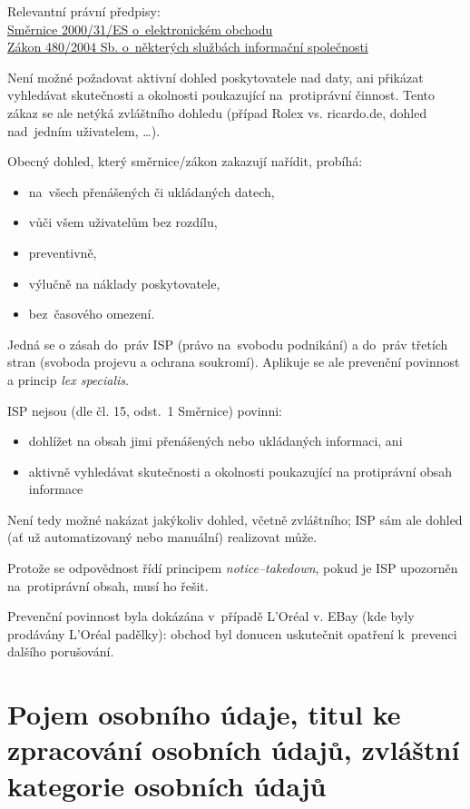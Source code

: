 {}Relevantní právní předpisy:
\\\href{https://eur-lex.europa.eu/legal-content/CS/ALL/?uri=CELEX:32000L0031
}{Směrnice 2000/31/ES o~elektronickém obchodu}
\\\href{https://www.zakonyprolidi.cz/cs/2004-480}{Zákon 480/2004 Sb. o~některých službách informační společnosti}


Není možné požadovat aktivní dohled poskytovatele nad daty, ani přikázat vyhledávat skutečnosti a okolnosti poukazující na~protiprávní činnost.
Tento zákaz se ale netýká zvláštního dohledu (případ Rolex vs. ricardo.de, dohled nad~jedním uživatelem, \dots).

Obecný dohled, který směrnice/zákon zakazují nařídit, probíhá:
\begin{itemize}
    \item na~všech přenášených či ukládaných datech,
    \item vůči všem uživatelům bez rozdílu,
    \item preventivně,
    \item výlučně na náklady poskytovatele,
    \item bez~časového omezení.
\end{itemize}
Jedná se o zásah do~práv ISP (právo na~svobodu podnikání) a do~práv třetích stran (svoboda projevu a ochrana soukromí).
Aplikuje se ale prevenční povinnost a princip \emph{lex specialis}.

ISP nejsou (dle čl. 15, odst.~1 Směrnice) povinni:
\begin{itemize}
    \item dohlížet na obsah jimi přenášených nebo ukládaných informaci, ani
    \item aktivně vyhledávat skutečnosti a okolnosti poukazující na protiprávní obsah informace
\end{itemize}

Není tedy možné nakázat jakýkoliv dohled, včetně zvláštního; ISP sám ale dohled (ať už automatizovaný nebo manuální) realizovat může.

Protože se odpovědnost řídí principem \emph{notice--takedown}, pokud je ISP upozorněn na~protiprávní obsah, musí ho řešit.

Prevenční povinnost byla dokázána v~případě L'Oréal v. EBay (kde byly prodávány L'Oréal padělky): obchod byl donucen uskutečnit opatření k~prevenci dalšího porušování.


\clearpage
\section{Pojem osobního údaje, titul ke zpracování osobních údajů, zvláštní kategorie osobních údajů}

